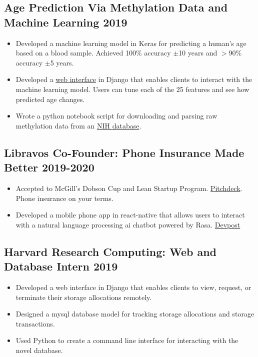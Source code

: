 \documentclass{article}
\begin{document}
\subsection{Age Prediction Via Methylation Data and Machine Learning \hfill 2019}
\begin{itemize}[leftmargin=0.5in]
  \setlength\itemsep{0.00em}
  \item Developed a machine learning model in Keras for predicting a human's age based on a blood sample. Achieved 100\% accuracy $\pm$10 years and $>90\%$ accuracy $\pm$5 years.
  \item Developed a \href{https://epigenosys.com}{web interface} in Django that enables clients to interact with the machine learning model. Users can tune each of the 25 features and see how predicted age changes.
  \item Wrote a python notebook script for downloading and parsing raw methylation data from an \href{https://www.ncbi.nlm.nih.gov/geo/query/acc.cgi?acc=GSE87571}{NIH database}.
\end{itemize}

\subsection{Libravos Co-Founder: Phone Insurance Made Better \hfill 2019-2020}
\begin{itemize}[leftmargin=0.5in]
  \setlength\itemsep{0.00em}
\item Accepted to McGill's Dobson Cup and Lean Startup Program. \href{https://docs.google.com/presentation/d/1mExXYPrHCWZ_4uRn0mu0f3_F_bhrw97eSgIJtMoN90k/edit?usp=sharing}{Pitchdeck}. Phone insurance on your terms.
\item Developed a mobile phone app in react-native that allows users to interact with a natural language processing ai chatbot powered by Rasa. \href{https://devpost.com/software/libravos-mobile-app-with-chat-bot}{Devpost}
\end{itemize}

\subsection{Harvard Research Computing: Web and Database Intern \hfill 2019}
\begin{itemize}[leftmargin=0.5in]
  \setlength\itemsep{0.00em}
  \item Developed a web interface in Django that enables clients to view, request, or terminate their storage allocations remotely.
  \item Designed a mysql database model for tracking storage allocations and storage transactions.
  \item Used Python to create a command line interface for interacting with the novel database.
\end{itemize}
\end{document}
